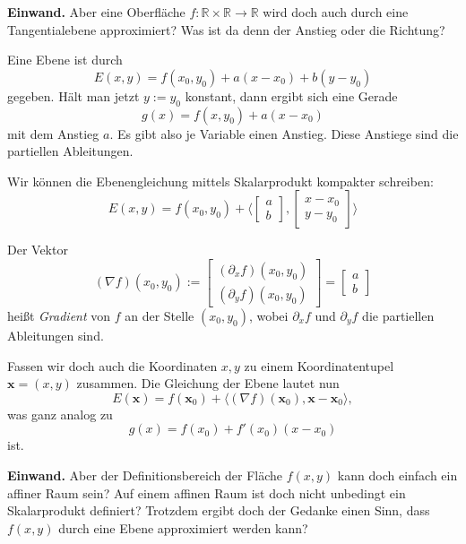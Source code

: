 \documentclass{beamer}
\newcommand{\R}{\mathbb R}
\begin{document}
\begin{frame}
\textbf{Einwand.}
Aber eine Oberfläche $f\colon\R\times\R\to\R$ wird doch auch durch
eine Tangentialebene approximiert? Was ist da denn der Anstieg
oder die Richtung?
\end{frame}

\begin{frame}
Eine Ebene ist durch
\[E(x,y) = f(x_0,y_0)+a(x-x_0)+b(y-y_0)\]
gegeben. Hält man jetzt $y:=y_0$ konstant, dann ergibt sich eine
Gerade
\[g(x) = f(x,y_0)+a(x-x_0)\]
mit dem Anstieg $a$. Es gibt also je Variable einen Anstieg. Diese
Anstiege sind die partiellen Ableitungen.
\end{frame}

\begin{frame}
Wir können die Ebenengleichung mittels Skalarprodukt kompakter schreiben:
\[E(x,y) = f(x_0,y_0) + \langle\begin{bmatrix}a\\ b\end{bmatrix},
\begin{bmatrix}x-x_0\\ y-y_0\end{bmatrix}\rangle\]
\end{frame}

\begin{frame}
Der Vektor
\[(\nabla f)(x_0,y_0) := \begin{bmatrix}(\partial_x f)(x_0,y_0)\\ (\partial_y f)(x_0,y_0)\end{bmatrix}
= \begin{bmatrix}a\\ b\end{bmatrix}\]
heißt \emph{Gradient} von $f$ an der Stelle $(x_0,y_0)$, wobei $\partial_x f$
und $\partial_y f$ die partiellen Ableitungen sind.
\end{frame}

\begin{frame}
Fassen wir doch auch die Koordinaten $x,y$ zu einem Koordinatentupel $\mathbf x = (x,y)$
zusammen. Die Gleichung der Ebene lautet nun
\[E(\mathbf x) = f(\mathbf x_0) + \langle(\nabla f)(\mathbf x_0),\mathbf x-\mathbf x_0\rangle,\]
was ganz analog zu
\[g(x) = f(x_0) + f'(x_0)(x-x_0)\]
ist.
\end{frame}

\begin{frame}
\textbf{Einwand.}
Aber der Definitionsbereich der Fläche $f(x,y)$ kann doch einfach ein
affiner Raum sein? Auf einem affinen Raum ist doch nicht unbedingt ein
Skalarprodukt definiert? Trotzdem ergibt doch der Gedanke einen Sinn,
dass $f(x,y)$ durch eine Ebene approximiert werden kann?
\end{frame}
\end{document}
